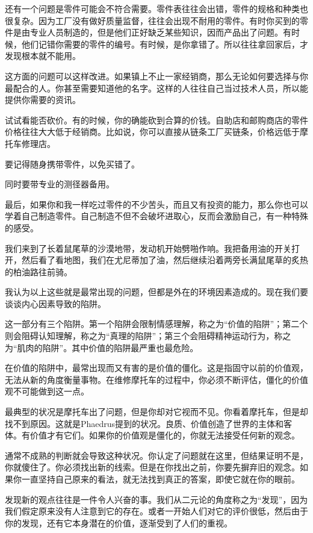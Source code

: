 \documentclass[UTF8]{article}
\begin{document}
\par 还有一个问题是零件可能会不符合需要。零件表往往会出错，零件的规格和种类也很复杂。因为工厂没有做好质量监督，往往会出现不耐用的零件。有时你买到的零件是由专业人员制造的，但是他们正好缺乏某些知识，因而产品出了问题。有时候，他们记错你需要的零件的编号。有时候，是你拿错了。所以往往拿回家后，才发现根本就不能用。
\par 这方面的问题可以这样改进。如果镇上不止一家经销商，那么无论如何要选择与你最配合的人。你甚至需要知道他的名字。这样的人往往自己当过技术人员，所以能提供你需要的资讯。
\par 试试看能否砍价。有的时候，你的确能砍到合算的价钱。自助店和邮购商店的零件价格往往大大低于经销商。比如说，你可以直接从链条工厂买链条，价格远低于摩托车修理店。
\par 要记得随身携带零件，以免买错了。
\par 同时要带专业的测径器备用。
\par 最后，如果你和我一样吃过零件的不少苦头，而且又有投资的能力，那么你也可以学着自己制造零件。自己制造不但不会破坏进取心，反而会激励自己，有一种特殊的感受。
\par 我们来到了长着鼠尾草的沙漠地带，发动机开始劈啪作响。我把备用油的开关打开，然后看了看地图，我们在尤尼蒂加了油，然后继续沿着两旁长满鼠尾草的炙热的柏油路往前骑。
\par 我认为以上这些就是最常出现的问题，但都是外在的环境因素造成的。现在我们要谈谈内心因素导致的陷阱。
\par 这一部分有三个陷阱。第一个陷阱会限制情感理解，称之为“价值的陷阱”；第二个则会阻碍认知理解，称之为“真理的陷阱”；第三个会阻碍精神运动行为，称之为“肌肉的陷阱”。其中价值的陷阱最严重也最危险。
\par 在价值的陷阱中，最常出现而又有害的是价值的僵化。这是指固守以前的价值观，无法从新的角度衡量事物。在维修摩托车的过程中，你必须不断评估，僵化的价值观不可能做到这一点。
\par 最典型的状况是摩托车出了问题，但是你却对它视而不见。你看着摩托车，但是却找不到原因。这就是Phaedrus提到的状况。良质、价值创造了世界的主体和客体。有价值才有它们。如果你的价值观是僵化的，你就无法接受任何新的观念。
\par 通常不成熟的判断就会导致这种状况。你认定了问题就在这里，但结果证明不是，你就傻住了。你必须找出新的线索。但是在你找出之前，你要先摒弃旧的观念。如果你一直坚持自己原来的看法，就无法找到真正的答案，即使它就在你的眼前。
\par 发现新的观点往往是一件令人兴奋的事。我们从二元论的角度称之为“发现”，因为我们假定原来没有人注意到它的存在。或者一开始人们对它的评价很低，然后由于你的发现，还有它本身潜在的价值，逐渐受到了人们的重视。
\end{document}
